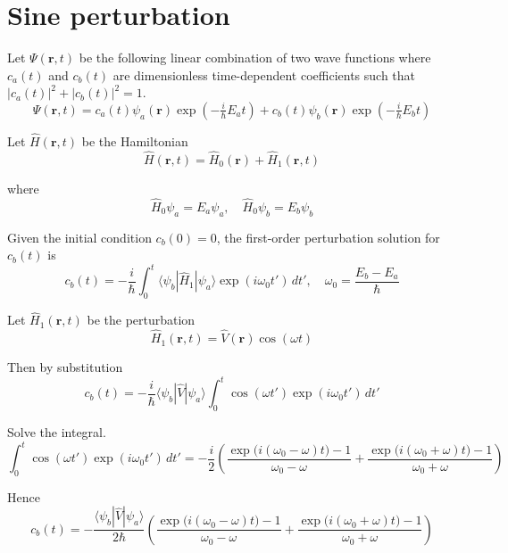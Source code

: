 

\section*{Sine perturbation}

Let $\Psi(\mathbf r,t)$ be the following linear combination of two wave functions
where $c_a(t)$ and $c_b(t)$ are dimensionless time-dependent coefficients
such that $|c_a(t)|^2+|c_b(t)|^2=1$.
\begin{equation*}
\Psi(\mathbf r,t)
=c_a(t)\psi_a(\mathbf r)\exp\left(-\tfrac{i}{\hbar}E_at\right)
+c_b(t)\psi_b(\mathbf r)\exp\left(-\tfrac{i}{\hbar}E_bt\right)
\end{equation*}

Let $\hat H(\mathbf r,t)$ be the Hamiltonian
\begin{equation*}
\hat H(\mathbf r,t)=\hat H_0(\mathbf r)+\hat H_1(\mathbf r,t)
\end{equation*}

where
\begin{equation*}
\hat H_0\psi_a=E_a\psi_a,\quad\hat H_0\psi_b=E_b\psi_b
\end{equation*}

Given the initial condition $c_b(0)=0$, the first-order perturbation solution for $c_b(t)$ is
\begin{equation*}
c_b(t)=-\frac{i}{\hbar}\int_0^t
\langle\psi_b|\hat H_1|\psi_a\rangle\exp(i\omega_0t')\,dt',\quad\omega_0=\frac{E_b-E_a}{\hbar}
\end{equation*}

Let $\hat H_1(\mathbf r,t)$ be the perturbation
\begin{equation*}
\hat H_1(\mathbf r,t)=\hat V(\mathbf r)\cos(\omega t)
\end{equation*}

Then by substitution
\begin{equation*}
c_b(t)=-\frac{i}{\hbar}\langle\psi_b|\hat V|\psi_a\rangle
\int_0^t\cos(\omega t')\exp(i\omega_0t')\,dt'
\end{equation*}

Solve the integral.
\begin{equation*}
\int_0^t\cos(\omega t')\exp(i\omega_0t')\,dt'
=-\frac{i}{2}
\left(
\frac{\exp\bigl(i(\omega_0-\omega)t\bigr)-1}{\omega_0-\omega}
+\frac{\exp\bigl(i(\omega_0+\omega)t\bigr)-1}{\omega_0+\omega}
\right)
\tag{1}
\end{equation*}

Hence
\begin{equation*}
c_b(t)=-\frac{\langle\psi_b|\hat V|\psi_a\rangle}{2\hbar}
\left(
\frac{\exp\bigl(i(\omega_0-\omega)t\bigr)-1}{\omega_0-\omega}
+\frac{\exp\bigl(i(\omega_0+\omega)t\bigr)-1}{\omega_0+\omega}
\right)
\tag{2}
\end{equation*}

